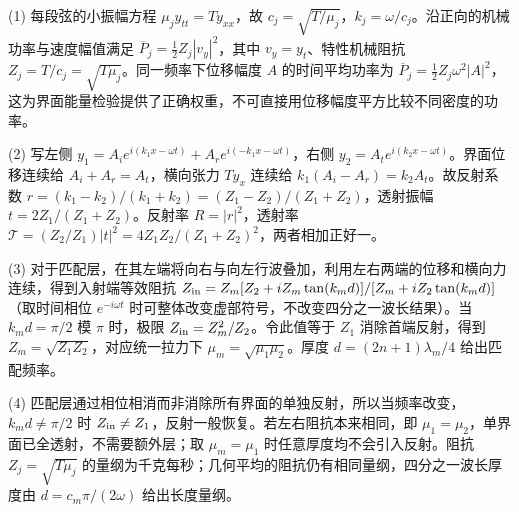 (1) 每段弦的小振幅方程 \(\mu_j y_{tt}=Ty_{xx}\)，故 \(c_j=\sqrt{T/\mu_j}\)，\(k_j=\omega/c_j\)。沿正向的机械功率与速度幅值满足 \(\overline P_j=\frac12Z_j|v_y|^2\)，其中 \(v_y=y_t\)、特性机械阻抗 \(Z_j=T/c_j=\sqrt{T\mu_j}\)。同一频率下位移幅度 \(A\) 的时间平均功率为 \(\overline P_j=\frac12 Z_j\omega^2|A|^2\)，这为界面能量检验提供了正确权重，不可直接用位移幅度平方比较不同密度的功率。

(2) 写左侧 \(y_1=A_ie^{i(k_1x-\omega t)}+A_re^{i(-k_1x-\omega t)}\)，右侧 \(y_2=A_te^{i(k_2x-\omega t)}\)。界面位移连续给 \(A_i+A_r=A_t\)，横向张力 \(T y_x\) 连续给 \(k_1(A_i-A_r)=k_2A_t\)。故反射系数 \(r=(k_1-k_2)/(k_1+k_2)=(Z_1-Z_2)/(Z_1+Z_2)\)，透射振幅 \(t=2Z_1/(Z_1+Z_2)\)。反射率 \(R=|r|^2\)，透射率 \(\mathcal T=(Z_2/Z_1)|t|^2=4Z_1Z_2/(Z_1+Z_2)^2\)，两者相加正好一。

(3) 对于匹配层，在其左端将向右与向左行波叠加，利用左右两端的位移和横向力连续，得到入射端等效阻抗 \(Z_{\rm in}=Z_m[Z_2+iZ_m\tan(k_md)]/[Z_m+iZ_2\tan(k_md)]\)（取时间相位 \(e^{-i\omega t}\) 时可整体改变虚部符号，不改变四分之一波长结果）。当 \(k_md=\pi/2\) 模 \(\pi\) 时，极限 \(Z_{\rm in}=Z_m^2/Z_2\)。令此值等于 \(Z_1\) 消除首端反射，得到 \(Z_m=\sqrt{Z_1Z_2}\)，对应统一拉力下 \(\mu_m=\sqrt{\mu_1\mu_2}\)。厚度 \(d=(2n+1)\lambda_m/4\) 给出匹配频率。

(4) 匹配层通过相位相消而非消除所有界面的单独反射，所以当频率改变，\(k_md\ne\pi/2\) 时 \(Z_{\rm in}\ne Z_1\)，反射一般恢复。若左右阻抗本来相同，即 \(\mu_1=\mu_2\)，单界面已全透射，不需要额外层；取 \(\mu_m=\mu_1\) 时任意厚度均不会引入反射。阻抗 \(Z_j=\sqrt{T\mu_j}\) 的量纲为千克每秒；几何平均的阻抗仍有相同量纲，四分之一波长厚度由 \(d=c_m\pi/(2\omega)\) 给出长度量纲。
